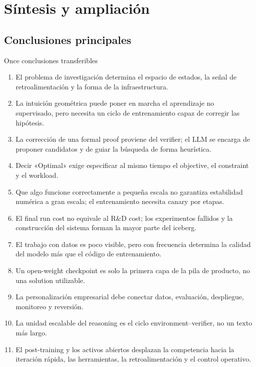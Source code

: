 \section{Síntesis y ampliación}

\subsection{Conclusiones principales}

\begin{importantbox}{Once conclusiones transferibles}
\begin{enumerate}
  \item El problema de investigación determina el espacio de estados, la señal de retroalimentación y la forma de la infraestructura.
  \item La intuición geométrica puede poner en marcha el aprendizaje no supervisado, pero necesita un ciclo de entrenamiento capaz de corregir las hipótesis.
  \item La corrección de una formal proof proviene del verifier; el LLM se encarga de proponer candidatos y de guiar la búsqueda de forma heurística.
  \item Decir «Optimal» exige especificar al mismo tiempo el objective, el constraint y el workload.
  \item Que algo funcione correctamente a pequeña escala no garantiza estabilidad numérica a gran escala; el entrenamiento necesita canary por etapas.
  \item El final run cost no equivale al R\&D cost; los experimentos fallidos y la construcción del sistema forman la mayor parte del iceberg.
  \item El trabajo con datos es poco visible, pero con frecuencia determina la calidad del modelo más que el código de entrenamiento.
  \item Un open-weight checkpoint es solo la primera capa de la pila de producto, no una solution utilizable.
  \item La personalización empresarial debe conectar datos, evaluación, despliegue, monitoreo y reversión.
  \item La unidad escalable del reasoning es el ciclo environment--verifier, no un texto más largo.
  \item El post-training y los activos abiertos desplazan la competencia hacia la iteración rápida, las herramientas, la retroalimentación y el control operativo.
\end{enumerate}
\end{importantbox}

